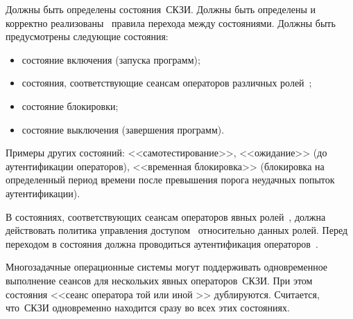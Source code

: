 \label{R.AC.States} %
Должны быть определены состояния~СКЗИ. Должны быть определены и 
корректно реализованы~ правила 
перехода между состояниями. Должны быть предусмотрены следующие состояния:
\begin{itemize}
\item
состояние включения (запуска программ);
\item
состояния, соответствующие сеансам операторов различных ролей~;
\item
состояние блокировки;
\item
состояние выключения (завершения программ).
\end{itemize}

\begin{note*}
Примеры других состояний: <<самотестирование>>,
<<ожидание>> (до аутентификации операторов),
<<временная блокировка>> (блокировка на определенный период времени
после превышения порога неудачных попыток аутентификации).
\end{note*}

\label{R.AC.OpStates} %
В состояниях, соответствующих сеансам операторов явных
ролей~, должна действовать политика управления 
доступом~ относительно данных ролей.
%
Перед переходом в состояния должна проводиться аутентификация
операторов~.

\begin{note*}
Многозадачные операционные системы могут поддерживать 
одновременное выполнение сеансов для нескольких явных операторов~СКЗИ.
При этом состояния <<сеанс оператора той или иной >> дублируются. 
Считается, что~СКЗИ одновременно находится сразу во всех этих состояниях. 
%
\end{note*}

